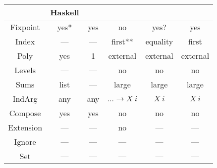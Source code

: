 \begin{tabular}{c | c c c c c}
             & Haskell        & \cite{initenough} & \cite{levitation} & \cite{algorn} & \cite{progorn} \\
    \hline                                                                                             
    Fixpoint & yes*           & yes               & no                & yes?          & yes            \\
    Index    & —              & —                 & first**           & equality      & first          \\
    Poly     & yes            & 1                 & external          & external      & external       \\
    Levels   & —              & —                 & no                & no            & no             \\
    Sums     & list           & —                 & large             & large         & large          \\
    IndArg   & any            & any               & $\dots \to X\ i$  & $X\ i$        & $X\ i$         \\
    Compose  & yes            & yes               & no                & no            & no             \\
    Extension& —              & —                 & no                & —             & —              \\
    Ignore   & —              & —                 & —                 & —             & —              \\
    Set      & —              & —                 & —                 & —             & —              \\
\end{tabular}


